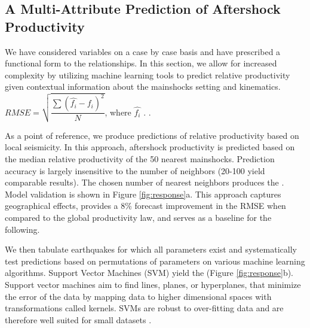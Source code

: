 \documentclass[draft, jgrga]{agujournal2018}
\begin{document}
    \subsection{A Multi-Attribute Prediction of Aftershock Productivity}
    
    We have considered variables on a case by case basis and have prescribed a functional form to the relationships. In this section, we allow for increased complexity by utilizing machine learning tools to predict relative productivity given contextual information about the mainshocks setting and kinematics.  $RMSE = \sqrt{\dfrac{\sum{(\hat{f_i}-f_i)^2}}{N}} $, where $\hat{f_i}$ .  \citep{witten2011}.
    
    As a point of reference, we produce predictions of relative productivity based on local seismicity. In this approach, aftershock productivity is predicted based on the median relative productivity of the 50 nearest mainshocks. Prediction accuracy is largely insensitive to the number of neighbors (20-100 yield comparable results). The chosen number of nearest neighbors produces the . Model validation is shown in Figure \ref{fig:response}a. This approach captures geographical effects, provides a 8\% forecast improvement in the RMSE when compared to the global productivity law, and serves as a baseline for the following.
    
    We then tabulate earthquakes for which all parameters exist and systematically test predictions based on permutations of parameters on various machine learning algorithms.  Support Vector Machines (SVM) yield the  (Figure \ref{fig:response}b). Support vector machines aim to find lines, planes, or hyperplanes, that minimize the error of the data by mapping data to higher dimensional spaces with transformations called kernels.  SVMs are robust to over-fitting data and are therefore well suited for small datasets \citep{witten2011}. 
    
\end{document}
